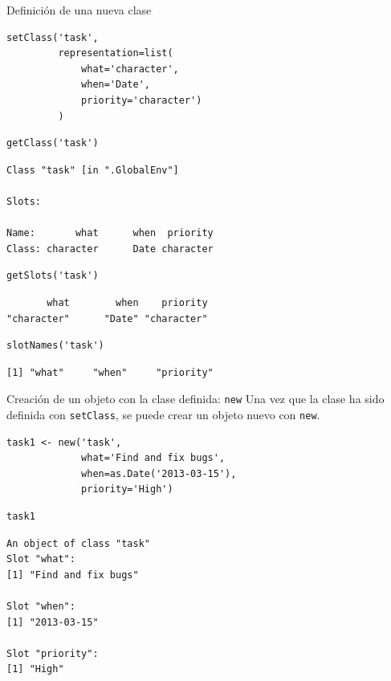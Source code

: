 \documentclass[xcolor={usenames,svgnames,dvipsnames}]{beamer}
\begin{document}
\begin{frame}[fragile,label={sec:orgheadline22}]{Definición de una nueva clase}
 \lstset{language=R,label= ,caption= ,captionpos=b,numbers=none}
\begin{lstlisting}
setClass('task',
         representation=list(
             what='character',
             when='Date',
             priority='character')
         )
\end{lstlisting}

\lstset{language=R,label= ,caption= ,captionpos=b,numbers=none}
\begin{lstlisting}
getClass('task')
\end{lstlisting}

\begin{verbatim}
Class "task" [in ".GlobalEnv"]

Slots:
                                    
Name:       what      when  priority
Class: character      Date character
\end{verbatim}

\lstset{language=R,label= ,caption= ,captionpos=b,numbers=none}
\begin{lstlisting}
getSlots('task')
\end{lstlisting}

\begin{verbatim}
       what        when    priority 
"character"      "Date" "character"
\end{verbatim}

\lstset{language=R,label= ,caption= ,captionpos=b,numbers=none}
\begin{lstlisting}
slotNames('task')
\end{lstlisting}

\begin{verbatim}
[1] "what"     "when"     "priority"
\end{verbatim}
\end{frame}

\begin{frame}[fragile,label={sec:orgheadline23}]{Creación de un objeto con la clase definida: \texttt{new}}
 Una vez que la clase ha sido definida con \texttt{setClass}, se puede crear un objeto nuevo con \texttt{new}.
\lstset{language=R,label= ,caption= ,captionpos=b,numbers=none}
\begin{lstlisting}
task1 <- new('task',
             what='Find and fix bugs',
             when=as.Date('2013-03-15'),
             priority='High')
\end{lstlisting}

\lstset{language=R,label= ,caption= ,captionpos=b,numbers=none}
\begin{lstlisting}
task1
\end{lstlisting}

\begin{verbatim}
An object of class "task"
Slot "what":
[1] "Find and fix bugs"

Slot "when":
[1] "2013-03-15"

Slot "priority":
[1] "High"
\end{verbatim}
\end{frame}
\end{document}
